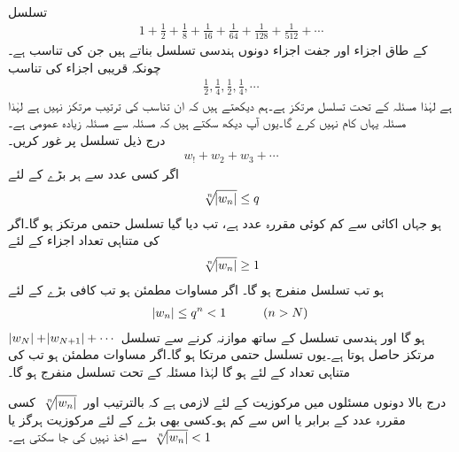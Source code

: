 \quad {}\\
تسلسل
\begin{align*}
1+\frac{1}{2}+\frac{1}{8}+\frac{1}{16}+\frac{1}{64}+\frac{1}{128}+\frac{1}{512}+\cdots
\end{align*}
کے طاق اجزاء اور جفت اجزاء دونوں ہندسی تسلسل بناتے ہیں جن کی تناسب  ہے۔چونکہ قریبی اجزاء کی تناسب
\begin{align*}
\frac{1}{2},\frac{1}{4},\frac{1}{2},\frac{1}{4},\cdots
\end{align*}
ہے لہٰذا مسئلہ  کے تحت تسلسل مرتکز ہے۔ہم دیکھتے ہیں کہ ان تناسب کی ترتیب مرتکز نہیں ہے لہٰذا  مسئلہ  یہاں کام نہیں کرے گا۔یوں آپ دیکھ سکتے ہیں کہ مسئلہ  سے مسئلہ  زیادہ عمومی ہے۔
\quad {}\\
درج ذیل تسلسل پر غور کریں۔
\begin{align*}
w_!+w_2+w_3+\cdots
\end{align*}
اگر کسی عدد  سے ہر بڑے   کے لئے
\begin{align}\label{مساوات_ترتیب_جذری_الف}
\sqrt[\leftroot{-2}n]{\abs{w_n}}\le q
\end{align}
ہو جہاں  اکائی سے کم کوئی مقررہ عدد ہے، تب دیا گیا تسلسل حتمی مرتکز ہو گا۔اگر  کی متناہی تعداد اجزاء  کے لئے 
\begin{align}\label{مساوات_ترتیب_جذری_ب}
\sqrt[\leftroot{-2}n]{\abs{w_n}}\ge 1
\end{align}
ہو تب تسلسل منفرج ہو گا۔
\quad
اگر مساوات  مطمئن ہو تب کافی بڑے  کے لئے
\begin{align*}
\abs{w_n}\le q^n<1 \quad \quad \quad (n>N)
\end{align*}
ہو گا اور ہندسی تسلسل کے ساتھ موازنہ کرنے سے تسلسل
$\,\abs{w_N}+\abs{w_{N+1}}+\cdots\,$
مرتکز حاصل ہوتا ہے۔یوں تسلسل  حتمی مرتکا ہو گا۔اگر مساوات  مطمئن ہو تب  کی متناہی تعداد کے لئے   ہو گا  لہٰذا مسئلہ  کے تحت تسلسل منفرج ہو گا۔


درج بالا دونوں مسئلوں میں مرکوزیت کے لئے لازمی ہے کہ بالترتیب  اور 
$\,\sqrt[\leftroot{-2}n]{\abs{w_n}}\,$
 کسی مقررہ عدد  کے برابر یا اس سے کم ہو۔کسی بھی بڑے  کے لئے مرکوزیت ہرگز    یا 
$\,\sqrt[\leftroot{-2}n]{\abs{w_n}}<1\,$
سے اخذ نہیں کی جا سکتی ہے۔


